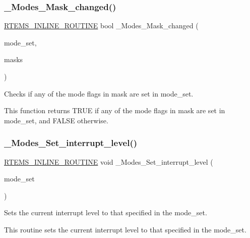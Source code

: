 \subsubsection{\texorpdfstring{\_Modes\_Mask\_changed()}{\_Modes\_Mask\_changed()}}
{\footnotesize\ttfamily \mbox{\hyperlink{group__RTEMSScoreBaseDefs_gac216239df231d5dbd15e3520b0b9313f}{R\+T\+E\+M\+S\+\_\+\+I\+N\+L\+I\+N\+E\+\_\+\+R\+O\+U\+T\+I\+NE}} bool \+\_\+\+Modes\+\_\+\+Mask\+\_\+changed (\begin{DoxyParamCaption}\item[{\mbox{\hyperlink{group__ClassicModes_ga8d46a41a837840dc97336fdcd20e4f68}{rtems\+\_\+mode}}}]{mode\+\_\+set,  }\item[{\mbox{\hyperlink{group__ClassicModes_ga8d46a41a837840dc97336fdcd20e4f68}{rtems\+\_\+mode}}}]{masks }\end{DoxyParamCaption})}



Checks if any of the mode flags in mask are set in mode\+\_\+set. 

This function returns T\+R\+UE if any of the mode flags in mask are set in mode\+\_\+set, and F\+A\+L\+SE otherwise. \mbox{\label{group__ClassicModesImpl_ga0fa0003793c7e73766faa9e5195c0070}} 
\subsubsection{\texorpdfstring{\_Modes\_Set\_interrupt\_level()}{\_Modes\_Set\_interrupt\_level()}}
{\footnotesize\ttfamily \mbox{\hyperlink{group__RTEMSScoreBaseDefs_gac216239df231d5dbd15e3520b0b9313f}{R\+T\+E\+M\+S\+\_\+\+I\+N\+L\+I\+N\+E\+\_\+\+R\+O\+U\+T\+I\+NE}} void \+\_\+\+Modes\+\_\+\+Set\+\_\+interrupt\+\_\+level (\begin{DoxyParamCaption}\item[{\mbox{\hyperlink{group__ClassicModes_ga8d46a41a837840dc97336fdcd20e4f68}{rtems\+\_\+mode}}}]{mode\+\_\+set }\end{DoxyParamCaption})}



Sets the current interrupt level to that specified in the mode\+\_\+set. 

This routine sets the current interrupt level to that specified in the mode\+\_\+set. 